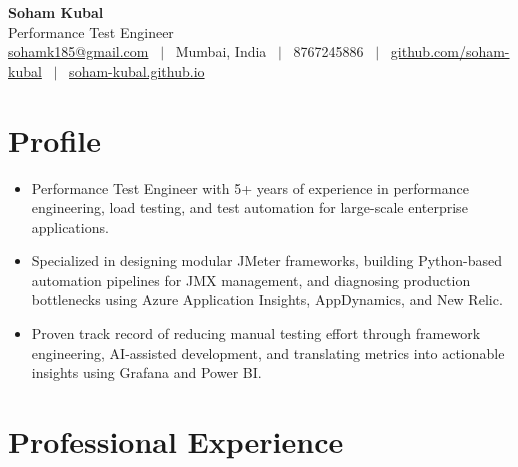 \documentclass[11pt,a4paper]{article}
\newenvironment{tightitemize}{%
  \begin{itemize}[leftmargin=1.3em, itemsep=3pt, topsep=4pt, parsep=0pt]
}{%
  \end{itemize}
  \vspace{4pt}
}
\begin{document}
\begin{center}
  {\Huge\textbf{Soham Kubal}}\\[4pt]
  {\large\color{accent} Performance Test Engineer}\\[6pt]
  \href{mailto:sohamk185@gmail.com}{sohamk185@gmail.com} ~$\vert$~
  Mumbai, India ~$\vert$~
  8767245886 ~$\vert$~
  \href{https://github.com/soham-kubal}{github.com/soham-kubal} ~$\vert$~
  \href{https://soham-kubal.github.io}{soham-kubal.github.io}
\end{center}

\vspace{6pt}

\section*{Profile}
\begin{tightitemize}
  \item Performance Test Engineer with 5+ years of experience in performance engineering, load testing, and test
    automation for large-scale enterprise applications.
  \item Specialized in designing modular JMeter frameworks, building Python-based automation pipelines for JMX
    management, and diagnosing production bottlenecks using Azure Application Insights, AppDynamics, and New Relic.
  \item Proven track record of reducing manual testing effort through framework engineering, AI-assisted
    development, and translating metrics into actionable insights using Grafana and Power BI.
\end{tightitemize}

\section*{Professional Experience}
\end{document}
